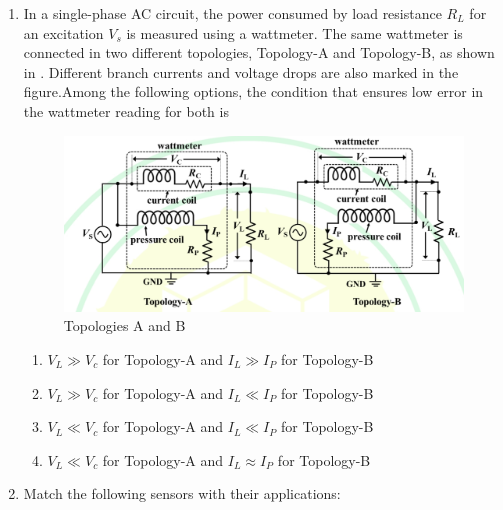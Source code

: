 \documentclass[journal,12pt,onecolumn]{IEEEtran}
\theoremstyle{remark}
\begin{document}
\begin{enumerate}
\item In a single-phase AC circuit, the power consumed by load resistance $R_L$ for an excitation $V_s$ is measured using a wattmeter. The same wattmeter is connected in two different topologies, Topology-A and Topology-B, as shown in . Different branch currents and voltage drops are also marked in the figure.Among the following options, the condition that ensures low error in the wattmeter reading for both is
\par\hfill{}
\begin{figure}[H]
    \centering
    \includegraphics[width=0.7\columnwidth]{Figs/Q-21.jpg}
    \caption{Topologies A and B}
    \label{21}
\end{figure}
\begin{enumerate}
\item $V_L \gg V_c$ for Topology-A and $I_L \gg I_P$ for Topology-B
\item $V_L \gg V_c$ for Topology-A and $I_L \ll I_P$ for Topology-B
\item $V_L \ll V_c$ for Topology-A and $I_L \ll I_P$ for Topology-B
\item $V_L \ll V_c$ for Topology-A and $I_L \approx I_P$ for Topology-B
\end{enumerate}

\item Match the following sensors with their applications:  
\begin{table}[H]
    \centering
    
\end{table}
\par\hfill{}
\begin{enumerate}
\end{enumerate}


\end{enumerate}
\end{document}
